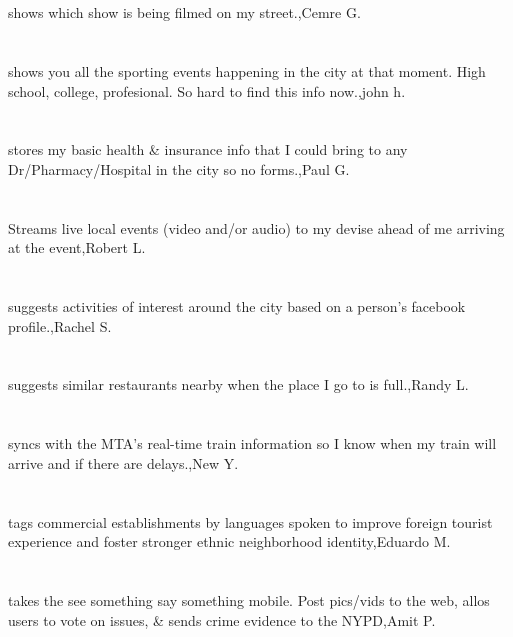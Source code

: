 \section{}shows which show is being filmed on my street.,Cemre G.	
\section{} shows you all the sporting events happening in the city at that moment.  High school, college, profesional. So hard to find this info now.,john h.	
\section{} stores my basic health \& insurance info that I could bring to any Dr/Pharmacy/Hospital in the city so no forms.,Paul G.	
\section{}Streams live local events (video and/or audio) to my devise ahead of me arriving at the event,Robert L.	
\section{}suggests activities of interest around the city based on a person's facebook profile.,Rachel S.	
\section{}suggests similar restaurants nearby when the place I go to is full.,Randy L.
\section{}syncs with the MTA's real-time train information so I know when my train will arrive and if there are delays.,New Y.
\section{}tags commercial establishments by languages spoken to improve foreign tourist experience and foster stronger ethnic neighborhood identity,Eduardo M.
\section{}takes the see something say something mobile. Post pics/vids to the web, allos users to vote on issues, \& sends crime evidence to the NYPD,Amit P.
